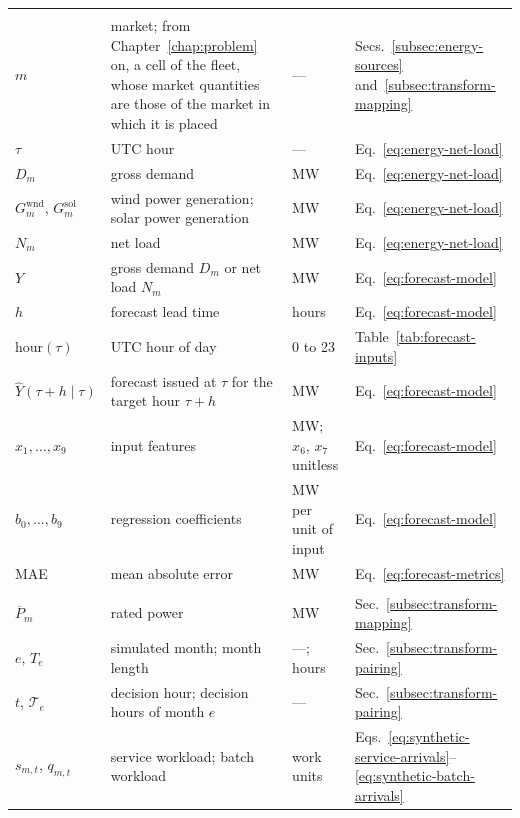 \documentclass{UNCC-thesis}
\begin{document}
\begin{longtable}{@{}L{0.15\textwidth}L{0.37\textwidth}L{0.25\textwidth}L{0.13\textwidth}@{}}
  \addlinespace
   \\
  \(m\) & market; from Chapter~\ref{chap:problem} on, a cell of the fleet, whose market quantities are those of the market in which it is placed & --- & Secs.~\ref{subsec:energy-sources} and~\ref{subsec:transform-mapping} \\
  \(\tau\) & UTC hour & --- & Eq.~\eqref{eq:energy-net-load} \\
  \(D_m\) & gross demand & MW & Eq.~\eqref{eq:energy-net-load} \\
  \(G^{\mathrm{wnd}}_m\), \(G^{\mathrm{sol}}_m\) & wind power generation; solar power generation & MW & Eq.~\eqref{eq:energy-net-load} \\
  \(N_m\) & net load & MW & Eq.~\eqref{eq:energy-net-load} \\
  \(Y\) & gross demand \(D_m\) or net load \(N_m\) & MW & Eq.~\eqref{eq:forecast-model} \\
  \(h\) & forecast lead time & hours & Eq.~\eqref{eq:forecast-model} \\
  \(\mathrm{hour}(\tau)\) & UTC hour of day & 0 to 23 & Table~\ref{tab:forecast-inputs} \\
  \(\widehat Y(\tau+h\mid\tau)\) & forecast issued at \(\tau\) for the target hour \(\tau+h\) & MW & Eq.~\eqref{eq:forecast-model} \\
  \(x_1,\dots,x_9\) & input features & MW; \(x_6\), \(x_7\) unitless & Eq.~\eqref{eq:forecast-model} \\
  \(b_0,\dots,b_9\) & regression coefficients & MW per unit of input & Eq.~\eqref{eq:forecast-model} \\
  MAE & mean absolute error & MW & Eq.~\eqref{eq:forecast-metrics} \\
  \addlinespace
   \\
  \(\overline P_m\) & rated power & MW & Sec.~\ref{subsec:transform-mapping} \\
  \(e\), \(T_e\) & simulated month; month length & ---; hours & Sec.~\ref{subsec:transform-pairing} \\
  \(t\), \(\mathcal T_e\) & decision hour; decision hours of month \(e\) & --- & Sec.~\ref{subsec:transform-pairing} \\
  \(s_{m,t}\), \(q_{m,t}\) & service workload; batch workload & work units & Eqs.~\eqref{eq:synthetic-service-arrivals}--\eqref{eq:synthetic-batch-arrivals} \\

\end{longtable}
\end{document}
